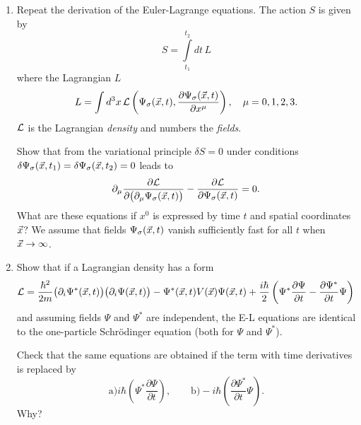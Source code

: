 \documentclass[a4paper,11pt]{article}
\begin{document}
\begin{enumerate}
\item Repeat the derivation of the Euler-Lagrange equations. The
  action $S$ is given by
  \begin{equation}
    \label{eq:QM32}
    S = \int\limits_{ t_{ 1 } }^{ t_{ 2 } } dt \, L
  \end{equation}
  where the Lagrangian $L$
  \begin{equation}
    \label{eq:QM33}
    L =
    \int d^{ 3 } x \, \mathcal{L}\left( \Psi_{ \sigma }( \vec{x}, t ),
      \frac{ \partial \Psi_{ \sigma }( \vec{x}, t ) }{ \partial x^{ \mu } } \right), \quad
    \mu = 0, 1, 2, 3.
  \end{equation}
  $\mathcal{L}$ is the Lagrangian \textit{density} and numbers the
  \textit{fields}.

  Show that from the variational principle $\delta S = 0$ under conditions
  $\delta \Psi_{ \sigma }( \vec{x}, t_{ 1 } ) = \delta \Psi_{ \sigma }(
  \vec{x}, t_{ 2 } ) = 0$ leads to
  \begin{equation}
    \label{eq:QM34}
    \partial_{ \mu } \frac{ \partial \mathcal{L} }{ \partial \big( \partial_{ \mu } \Psi_{ \sigma }( \vec{x}, t ) \big) }
    - \frac{ \partial \mathcal{L} }{ \partial \Psi_{ \sigma }( \vec{x}, t ) }
    = 0.
  \end{equation}
  What are these equations if $x^{ 0 }$ is expressed by time $t$ and
  spatial coordinates $\vec{x}$? We assume that fields
  $\Psi_{ \sigma }( \vec{x}, t )$ vanish sufficiently fast for all $t$
  when $\vec{x} \to \infty$.



\item Show that if a Lagrangian density has a form
  \begin{equation}
    \label{eq:QM35}
    \mathcal{L} =
    \frac{ \hbar^{ 2 } }{ 2m } \big( \partial_{ i } \Psi^{ * }( \vec{x}, t ) \big)
    \big( \partial_{ i } \Psi( \vec{x}, t ) \big)
    - \Psi^{ * }( \vec{x}, t ) V( \vec{x} ) \Psi( \vec{x}, t )
    + \frac{ i \hbar }{ 2 } \left( \Psi^{ * } \frac{ \partial \Psi }{ \partial t }
      - \frac{ \partial \Psi^{ * } }{ \partial t } \Psi \right)
  \end{equation}
  and assuming fields $\Psi$ and $\Psi^{ * }$ are independent, the E-L
  equations are identical to the one-particle Schr\"{o}dinger equation
  (both for $\Psi$ and $\Psi^{ * }$).

  Check that the same equations are obtained if the term with time
  derivatives is replaced by
  \begin{equation}
    \label{eq:QM36}
    \textrm{a)} i \hbar \left( \Psi^{ * } \frac{ \partial \Psi }{ \partial t } \right), \qquad
    \textrm{b)} -i \hbar \left( \frac{ \partial \Psi^{ * } }{ \partial t } \Psi \right).
  \end{equation}
  Why?




\end{enumerate}
\end{document}
